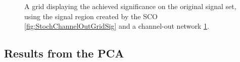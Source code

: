 \begin{figure}[H]
{\begin{subfigure}{.5\textwidth}
        \vspace{-1cm}
        \caption{}
        \label{fig:ChannelOutGridSig}
    \end{subfigure}
    }
    \caption{A grid displaying the achieved significance on the original signal set, using the signal region 
    created by the \acs{SCO} \ref{fig:StochChannelOutGridSig} and a channel-out network \ref{fig:ChannelOutGridSig}.}
    \label{fig:SCOCO}
\end{figure}

\subsection{Results from the \ac{PCA}}\label{appendix:PCA}
\begin{figure}[H]
\end{figure}

